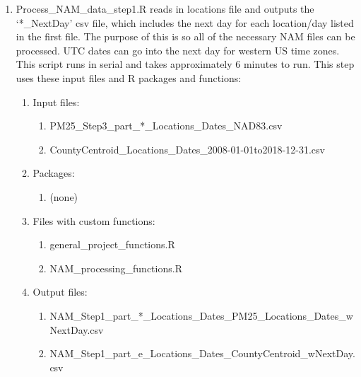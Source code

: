 \begin{enumerate}
\item Process\_NAM\_data\_step1.R reads in locations file and outputs the `*\_NextDay' csv file, %
which includes the next day for each location/day listed in the first file. The purpose of this is so all of the necessary NAM files can be processed. UTC dates can go into the next day for western US time zones. This script runs in serial and takes approximately 6 minutes to run. This step uses these input files and R packages and functions:
	\begin{enumerate}
	\item Input files:
		\begin{enumerate}
		\item PM25\_Step3\_part\_*\_Locations\_Dates\_NAD83.csv  %
		\item CountyCentroid\_Locations\_Dates\_2008-01-01to2018-12-31.csv
		\end{enumerate}
	\item Packages:
		\begin{enumerate}
		\item (none)
		\end{enumerate}
	\item Files with custom functions:
		\begin{enumerate}
		\item general\_project\_functions.R %
		\item NAM\_processing\_functions.R
		\end{enumerate}
	\item Output files:
		\begin{enumerate}
		\item NAM\_Step1\_part\_*\_Locations\_Dates\_PM25\_Locations\_Dates\_wNextDay.csv
		\item NAM\_Step1\_part\_e\_Locations\_Dates\_CountyCentroid\_wNextDay.csv
		\end{enumerate}
	\end{enumerate}
	

\end{enumerate}
